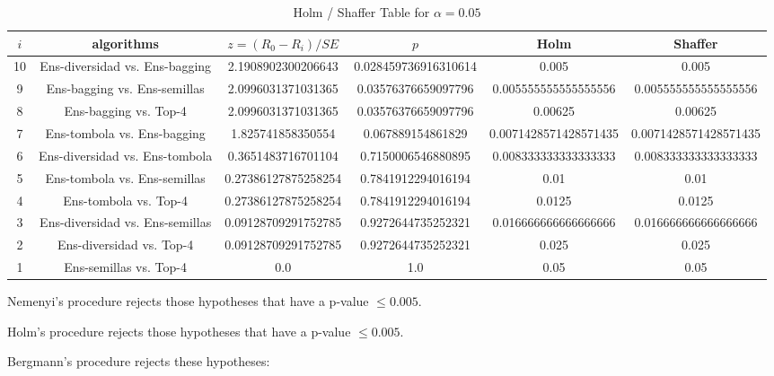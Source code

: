 \documentclass[a4paper,10pt]{article}
\begin{document}
\begin{landscape}
\begin{table}[!htp]
\centering\tiny
\caption{Holm / Shaffer Table for $\alpha=0.05$}
\begin{tabular}{cccccc}
$i$&algorithms&$z=(R_0 - R_i)/SE$&$p$&Holm&Shaffer\\
\hline
10&Ens-diversidad vs. Ens-bagging&2.1908902300206643&0.028459736916310614&0.005&0.005\\
9&Ens-bagging vs. Ens-semillas&2.0996031371031365&0.03576376659097796&0.005555555555555556&0.005555555555555556\\
8&Ens-bagging vs. Top-4&2.0996031371031365&0.03576376659097796&0.00625&0.00625\\
7&Ens-tombola vs. Ens-bagging&1.825741858350554&0.067889154861829&0.0071428571428571435&0.0071428571428571435\\
6&Ens-diversidad vs. Ens-tombola&0.3651483716701104&0.7150006546880895&0.008333333333333333&0.008333333333333333\\
5&Ens-tombola vs. Ens-semillas&0.27386127875258254&0.7841912294016194&0.01&0.01\\
4&Ens-tombola vs. Top-4&0.27386127875258254&0.7841912294016194&0.0125&0.0125\\
3&Ens-diversidad vs. Ens-semillas&0.09128709291752785&0.9272644735252321&0.016666666666666666&0.016666666666666666\\
2&Ens-diversidad vs. Top-4&0.09128709291752785&0.9272644735252321&0.025&0.025\\
1&Ens-semillas vs. Top-4&0.0&1.0&0.05&0.05\\
\hline
\end{tabular}
\end{table}
Nemenyi's procedure rejects those hypotheses that have a p-value $\le0.005$.


Holm's procedure rejects those hypotheses that have a p-value $\le0.005$.


Bergmann's procedure rejects these hypotheses:


\begin{itemize}


\end{itemize}



\end{landscape}
\end{document}
